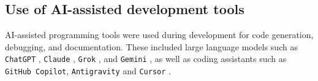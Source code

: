 \subsection{Use of AI-assisted development tools}

AI-assisted programming tools were used during development for code generation, debugging, and documentation. These included large language models such as \texttt{ChatGPT} \parencite{chatgpt}, \texttt{Claude} \parencite{claude}, \texttt{Grok} \parencite{grok}, and \texttt{Gemini} \parencite{gemini}, as well as coding assistants such as \texttt{GitHub Copilot}, \texttt{Antigravity} and \texttt{Cursor} \parencite{copilot,google-antigravity,cursor}. 
